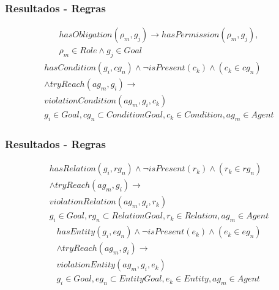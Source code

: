\documentclass{beamer}
\begin{document}
\begin{frame}
	\frametitle{Resultados - Regras}
	\begin{eqnarray}\label{reldeonticrole}
		hasObligation(\rho_m,g_j) \to hasPermission(\rho_m,g_j), \nonumber \\
	    \rho_m \in Role \wedge g_j \in Goal
	\end{eqnarray}
	\begin{eqnarray}\label{violationcondition}\nonumber
		hasCondition(g_i,cg_n) \wedge \neg isPresent(c_k) \wedge (c_k \in cg_n) \\
		\wedge tryReach(ag_m,g_i) \to \nonumber \\  
		violationCondition(ag_m,g_i,c_k) \nonumber \\  
	    g_i \in Goal, cg_n \subset ConditionGoal, c_k \in Condition, ag_m \in Agent
	\end{eqnarray}
\end{frame}
\begin{frame}
	\frametitle{Resultados - Regras}
	\begin{eqnarray}\label{violationrelation}\nonumber
		hasRelation(g_i,rg_n)\wedge \neg isPresent(r_k) \wedge (r_k \in rg_n) \\ \nonumber
		\wedge tryReach(ag_m,g_i) \to \nonumber \\
		violationRelation(ag_m,g_i,r_k) \nonumber \\  
	    g_i \in Goal, rg_n \subset RelationGoal, r_k \in Relation, ag_m \in Agent
	\end{eqnarray}
	\begin{eqnarray}\label{violationentity}\nonumber
		hasEntity(g_i,eg_n) \wedge \neg isPresent(e_k) 	\wedge (e_k \in eg_n) \\
		\wedge tryReach(ag_m,g_i) \to \nonumber \\ 
	    violationEntity(ag_m,g_i,e_k)  \nonumber \\  
	    g_i \in Goal, eg_n \subset EntityGoal, e_k \in Entity, ag_m \in Agent
	\end{eqnarray}
\end{frame}
\end{document}
